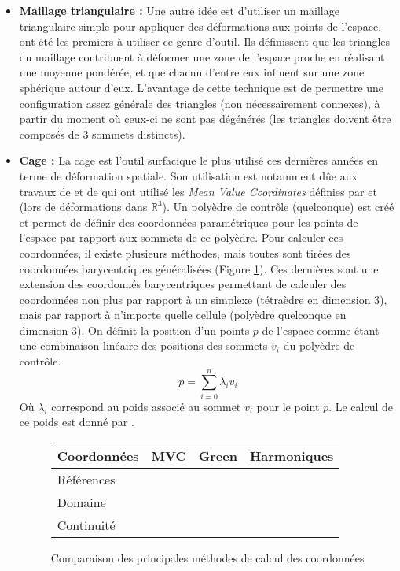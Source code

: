\begin{itemize}
\item{\textbf{Maillage triangulaire :}} Une autre idée est d'utiliser
  un maillage triangulaire simple pour appliquer des déformations aux
  points de l'espace. \cite{KO03} ont été les premiers à utiliser ce
  genre d'outil. Ils définissent que les triangles du maillage
  contribuent à déformer une zone de l'espace proche en réalisant une
  moyenne pondérée, et que chacun d'entre eux influent sur une zone
  sphérique autour d'eux. L'avantage de cette technique est de
  permettre une configuration assez générale des triangles (non
  nécessairement connexes), à partir du moment où ceux-ci ne sont pas
  dégénérés (les triangles doivent être composés de 3 sommets
  distincts).
\item{\textbf{Cage :}} La cage est l'outil surfacique le plus utilisé
  ces dernières années en terme de déformation spatiale. Son
  utilisation est notamment dûe aux travaux de \cite{JSW05} et de
  \cite{HF06} qui ont utilisé les \textit{Mean Value Coordinates}
  définies par \cite{Flo03} et \cite{FKR05} (lors de déformations dans
  $\mathbb{R}^3$). Un polyèdre de contrôle (quelconque) est créé et
  permet de définir des coordonnées paramétriques pour les points de
  l'espace par rapport aux sommets de ce polyèdre. Pour calculer ces
  coordonnées, il existe plusieurs méthodes, mais toutes sont tirées
  des coordonnées barycentriques généralisées (Figure
  \ref{SURcoo}). Ces dernières sont une extension des coordonnés
  barycentriques permettant de calculer des coordonnées non plus par
  rapport à un simplexe (tétraèdre en dimension 3), mais par rapport à
  n'importe quelle cellule (polyèdre quelconque en dimension 3). On
  définit la position d'un points $p$ de l'espace comme étant une
  combinaison linéaire des positions des sommets $v_i$ du polyèdre de
  contrôle.
  \begin{equation}
    p = \sum_{i=0}^n \lambda_iv_i
  \end{equation}
  Où $\lambda_i$ correspond au poids associé au sommet $v_i$ pour le
  point $p$. Le calcul de ce poids est donné par \cite{FKR05}.

  \begin{figure}[h]
    \begin{center}
      \begin{tabular}{|l|c|c|c|}
        \hline
        Coordonnées & MVC & Green & Harmoniques \\
        \hline
        Références & & & \\
        \hline
        Domaine & & & \\
        \hline
        Continuité & & & \\
        \hline
      \end{tabular}
      \caption{Comparaison des principales méthodes de calcul des
        coordonnées}
      \label{SURcoo}
    \end{center}
  \end{figure}

\end{itemize}

